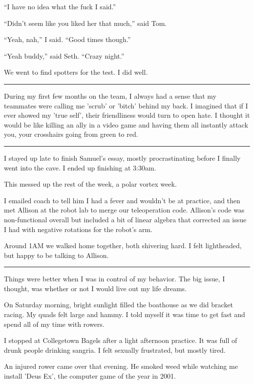 ``I have no idea what the fuck I said.''

``Didn't seem like you liked her that much,'' said Tom.

``Yeah, nah,'' I said.  ``Good times though.''

``Yeah buddy,'' said Seth.  ``Crazy night.'' 

We went to find spotters for the test.  I did well.

\plainfancybreak{12pt}{2}{}

During my first few months on the team, I always had a sense that my teammates
were calling me 'scrub' or 'bitch' behind my back.  I imagined that if I ever
showed my 'true self', their friendliness would turn to open hate.  I thought it
would be like killing an ally in a video game and having them all instantly
attack you, your crosshairs going from green to red. 

\plainfancybreak{12pt}{2}{}

I stayed up late to finish Samuel's essay, mostly procrastinating before I
finally went into the cave.  I ended up finishing at 3:30am.

This messed up the rest of the week, a polar vortex week.

I emailed coach to tell him I had a fever and wouldn't be at practice, and then
met Allison at the robot lab to merge our teleoperation code.   Allison's code
was non-functional overall but included a bit of linear algebra that corrected
an issue I had with negative rotations for the robot's arm.

Around 1AM we walked home together, both shivering hard.  I felt lightheaded,
but happy to be talking to Allison. 

\plainfancybreak{12pt}{2}{}

Things were better when I was in control of my behavior.  The big issue, I
thought, was whether or not I would live out my life dreams.

On Saturday morning, bright sunlight filled the boathouse as we did bracket
racing.  My quads felt large and hammy.  I told myself it was time to get fast
and spend all of my time with rowers.

I stopped at Collegetown Bagels after a light afternoon practice.  It was full
of drunk people drinking sangria.  I felt sexually frustrated, but mostly tired.  

An injured rower came over that evening.  He smoked weed while watching me
install 'Deus Ex', the computer game of the year in 2001. 

